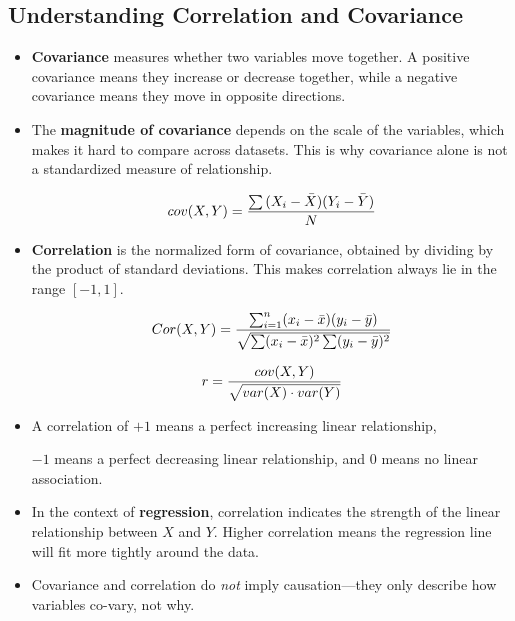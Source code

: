 \documentclass[11pt,a4paper]{article}
\begin{document}
\subsection{Understanding Correlation and Covariance}
\begin{itemize}
    \item \textbf{Covariance} measures whether two variables move together. 
    A positive covariance means they increase or decrease together, while a negative covariance means they move in opposite directions.

    \item The \textbf{magnitude of covariance} depends on the scale of the variables, which makes it hard to compare across datasets. 
    This is why covariance alone is not a standardized measure of relationship.

    \begin{equation*}
        \Large cov(X, Y) = \frac{\sum{(X_i - \bar{X})(Y_i - \bar{Y})}}{N}
    \end{equation*}
    

    \item \textbf{Correlation} is the normalized form of covariance, obtained by dividing by the product of standard deviations. 
    This makes correlation always lie in the range $[-1, 1]$.


    \begin{align*}
        \Large Cor(X,Y) = \frac{\sum_{i=1}^{n}(x_i-\bar{x})(y_i-\bar{y})}{\sqrt{\sum(x_i-\bar{x})^2 \sum(y_i-\bar{y})^2}}
    \end{align*}

    \begin{equation*}
        \Large r = \frac{cov(X, Y)}{\sqrt{var(X) \cdot var(Y)}}
    \end{equation*}

    
    \item A correlation of \textbf{$+1$} means a perfect increasing linear relationship, 
    
    \textbf{$-1$} means a perfect decreasing linear relationship, 
    and \textbf{$0$} means no linear association.

    \item In the context of \textbf{regression}, correlation indicates the strength of the linear relationship between $X$ and $Y$.  
    Higher correlation means the regression line will fit more tightly around the data.

    \item Covariance and correlation do \emph{not} imply causation—they only describe how variables co-vary, not why.
\end{itemize}
\end{document}
